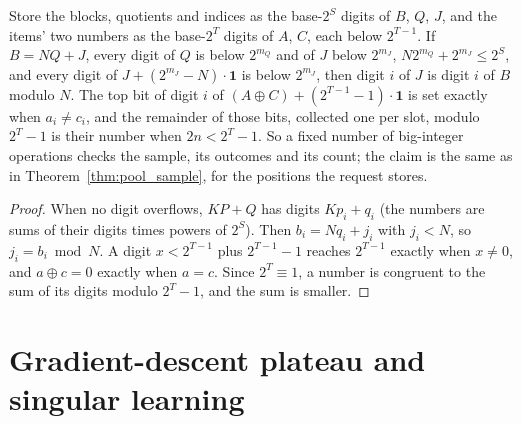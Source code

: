 \begin{theorem}\label{thm:pool_sample_packed}
\leanok
{}
Store the blocks, quotients and indices as the base-$2^S$ digits of $B$, $Q$, $J$, and the items'
two numbers as the base-$2^T$ digits of $A$, $C$, each below $2^{T-1}$. If $B = NQ + J$, every
digit of $Q$ is below $2^{m_Q}$ and of $J$ below $2^{m_J}$, $N 2^{m_Q} + 2^{m_J} \le 2^S$, and every
digit of $J + (2^{m_J} - N)\cdot\mathbf 1$ is below $2^{m_J}$, then digit $i$ of $J$ is digit $i$ of
$B$ modulo $N$. The top bit of digit $i$ of $(A \oplus C) + (2^{T-1} - 1)\cdot\mathbf 1$ is set
exactly when $a_i \ne c_i$, and the remainder of those bits, collected one per slot, modulo
$2^T - 1$ is their number when $2n < 2^T - 1$. So a fixed number of big-integer operations checks
the sample, its outcomes and its count; the claim is the same as in Theorem~\ref{thm:pool_sample},
for the positions the request stores.
\end{theorem}
\begin{proof}
\leanok
When no digit overflows, $K P + Q$ has digits $K p_i + q_i$ (the numbers are sums of their digits
times powers of $2^S$). Then $b_i = N q_i + j_i$ with $j_i < N$, so $j_i = b_i \bmod N$. A digit
$x < 2^{T-1}$ plus $2^{T-1} - 1$ reaches $2^{T-1}$ exactly when $x \ne 0$, and $a \oplus c = 0$
exactly when $a = c$. Since $2^T \equiv 1$, a number is congruent to the sum of its digits modulo
$2^T - 1$, and the sum is smaller.
\end{proof}

\chapter{Gradient-descent plateau and singular learning}

